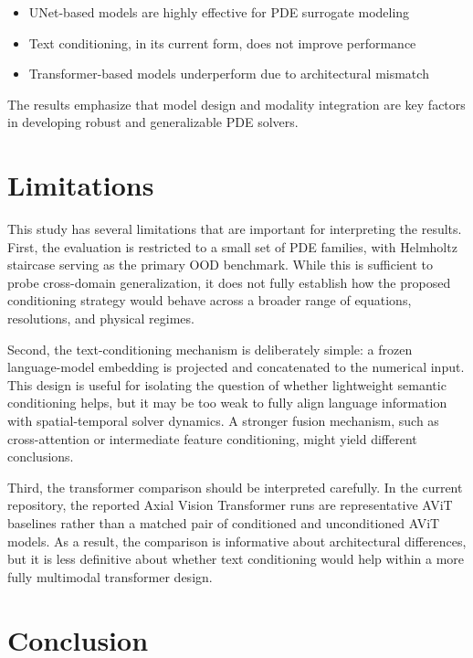 \documentclass[
]{article}
\providecommand{\tightlist}{%
  \setlength{\itemsep}{0pt}\setlength{\parskip}{0pt}}
\begin{document}
\begin{itemize}
\tightlist
\item
  UNet-based models are highly effective for PDE surrogate modeling
\item
  Text conditioning, in its current form, does not improve performance
\item
  Transformer-based models underperform due to architectural mismatch
\end{itemize}

The results emphasize that model design and modality integration are key
factors in developing robust and generalizable PDE solvers.

\section{Limitations}\label{limitations}

This study has several limitations that are important for interpreting
the results. First, the evaluation is restricted to a small set of PDE
families, with Helmholtz staircase serving as the primary OOD benchmark.
While this is sufficient to probe cross-domain generalization, it does
not fully establish how the proposed conditioning strategy would behave
across a broader range of equations, resolutions, and physical regimes.

Second, the text-conditioning mechanism is deliberately simple: a frozen
language-model embedding is projected and concatenated to the numerical
input. This design is useful for isolating the question of whether
lightweight semantic conditioning helps, but it may be too weak to fully
align language information with spatial-temporal solver dynamics. A
stronger fusion mechanism, such as cross-attention or intermediate
feature conditioning, might yield different conclusions.

Third, the transformer comparison should be interpreted carefully. In
the current repository, the reported Axial Vision Transformer runs are
representative AViT baselines rather than a matched pair of conditioned
and unconditioned AViT models. As a result, the comparison is
informative about architectural differences, but it is less definitive
about whether text conditioning would help within a more fully
multimodal transformer design.

\section{Conclusion}\label{conclusion}
\end{document}
